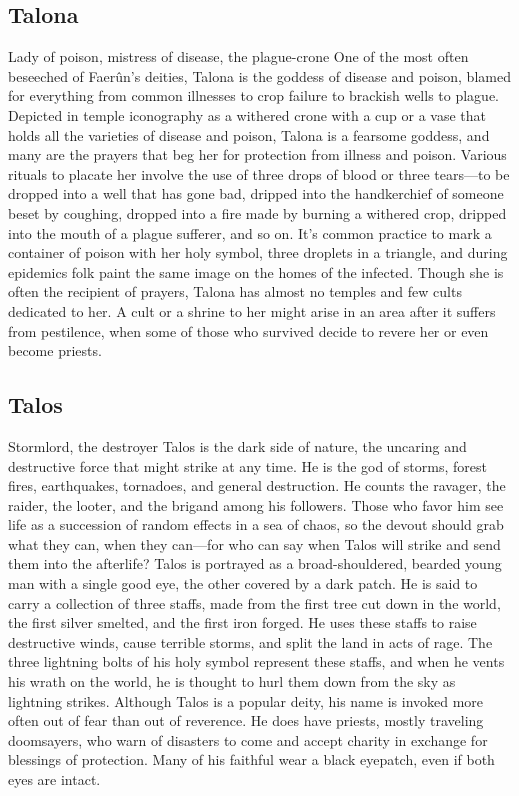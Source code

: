\documentclass[10pt,a4paper,twoside,twocolumn,openany,bg=print,nodeprecatedcode]{dndbook}
\begin{document}
\subsection{Talona}
Lady of poison, mistress of disease, the plague-crone
One of the most often beseeched of Faerûn's deities, Talona is the goddess of disease and poison, blamed for everything from common illnesses to crop failure to brackish wells to plague. Depicted in temple iconography as a withered crone with a cup or a vase that holds all the varieties of disease and poison, Talona is a fearsome goddess, and many are the prayers that beg her for protection from illness and poison. Various rituals to placate her involve the use of three drops of blood or three tears—to be dropped into a well that has gone bad, dripped into the handkerchief of someone beset by coughing, dropped into a fire made by burning a withered crop, dripped into the mouth of a plague sufferer, and so on. It's common practice to mark a container of poison with her holy symbol, three droplets in a triangle, and during epidemics folk paint the same image on the homes of the infected.
Though she is often the recipient of prayers, Talona has almost no temples and few cults dedicated to her. A cult or a shrine to her might arise in an area after it suffers from pestilence, when some of those who survived decide to revere her or even become priests.
\subsection{Talos}
Stormlord, the destroyer
Talos is the dark side of nature, the uncaring and destructive force that might strike at any time. He is the god of storms, forest fires, earthquakes, tornadoes, and general destruction. He counts the ravager, the raider, the looter, and the brigand among his followers. Those who favor him see life as a succession of random effects in a sea of chaos, so the devout should grab what they can, when they can—for who can say when Talos will strike and send them into the afterlife?
Talos is portrayed as a broad-shouldered, bearded young man with a single good eye, the other covered by a dark patch. He is said to carry a collection of three staffs, made from the first tree cut down in the world, the first silver smelted, and the first iron forged. He uses these staffs to raise destructive winds, cause terrible storms, and split the land in acts of rage. The three lightning bolts of his holy symbol represent these staffs, and when he vents his wrath on the world, he is thought to hurl them down from the sky as lightning strikes.
Although Talos is a popular deity, his name is invoked more often out of fear than out of reverence. He does have priests, mostly traveling doomsayers, who warn of disasters to come and accept charity in exchange for blessings of protection. Many of his faithful wear a black eyepatch, even if both eyes are intact.
\end{document}
